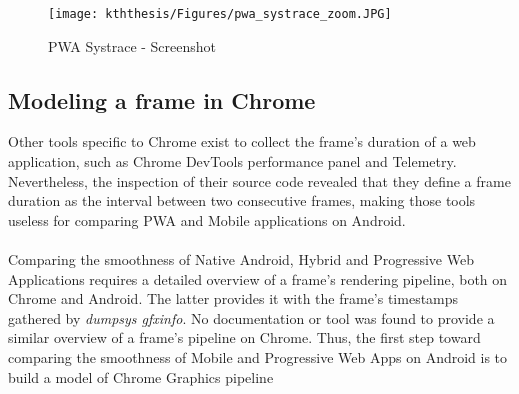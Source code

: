 \documentclass{kththesis}
\begin{document}
    \begin{figure}
        \centering
        \texttt{[image: kththesis/Figures/pwa\_systrace\_zoom.JPG]}
        \caption{PWA Systrace - Screenshot}
        \label{fig:pwa_systrace_zoom}
    \end{figure}
    
    \subsection{Modeling a frame in Chrome}
    
    Other tools specific to Chrome exist to collect the frame's duration of a web application, such as Chrome DevTools performance panel and Telemetry. Nevertheless, the inspection of their source code revealed that they define a frame duration as the interval between two consecutive frames, making those tools useless for comparing PWA and Mobile applications on Android.
    
    \paragraph{}
    Comparing the smoothness of Native Android, Hybrid and Progressive Web Applications requires a detailed overview of a frame's rendering pipeline, both on Chrome and Android. The latter provides it with the frame's timestamps gathered by \textit{dumpsys gfxinfo}. No documentation or tool was found to provide a similar overview of a frame's pipeline on Chrome. Thus, the first step toward comparing the smoothness of Mobile and Progressive Web Apps on Android is to build a model of Chrome Graphics pipeline
    
    
\end{document}
